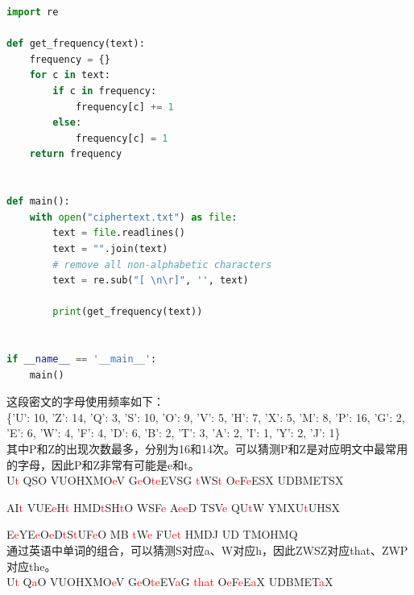 
\begin{lstlisting}[language=Python]
import re

def get_frequency(text):
    frequency = {}
    for c in text:
        if c in frequency:
            frequency[c] += 1
        else:
            frequency[c] = 1
    return frequency


def main():
    with open("ciphertext.txt") as file:
        text = file.readlines()
        text = "".join(text)   
        # remove all non-alphabetic characters
        text = re.sub("[ \n\r]", '', text)

        print(get_frequency(text))


if __name__ == '__main__':
    main()
\end{lstlisting}

这段密文的字母使用频率如下：\\

\{'U': 10, 'Z': 14, 'Q': 3, 'S': 10, 'O': 9, 'V': 5, 'H': 7, 'X': 5, 'M': 8, 'P': 16, 'G': 2, 'E': 6, 'W': 4, 'F': 4, 'D': 6, 'B': 2, 'T': 3, 'A': 2, 'I': 1, 'Y': 2, 'J': 1\}\\

其中P和Z的出现次数最多，分别为16和14次。可以猜测P和Z是对应明文中最常用的字母，因此P和Z非常有可能是e和t。\\

U\textcolor{red}{t} QSO VUOHXMO\textcolor{red}{e}V G\textcolor{red}{e}O\textcolor{red}{t}\textcolor{red}{e}EVSG \textcolor{red}{t}WS\textcolor{red}{t} O\textcolor{red}{e}F\textcolor{red}{e}ESX UDBMETSX

AI\textcolor{red}{t} VUE\textcolor{red}{e}H\textcolor{red}{t} HMD\textcolor{red}{t}SH\textcolor{red}{t}O WSF\textcolor{red}{e} A\textcolor{red}{ee}D TSV\textcolor{red}{e} QU\textcolor{red}{t}W YMXU\textcolor{red}{t}UHSX

E\textcolor{red}{e}YE\textcolor{red}{e}O\textcolor{red}{e}D\textcolor{red}{t}S\textcolor{red}{t}UF\textcolor{red}{e}O MB \textcolor{red}{t}W\textcolor{red}{e} FU\textcolor{red}{et} HMDJ UD TMOHMQ\\

通过英语中单词的组合，可以猜测S对应a、W对应h，因此ZWSZ对应that、ZWP对应the。\\

U\textcolor{red}{t} Q\textcolor{red}{a}O VUOHXMO\textcolor{red}{e}V G\textcolor{red}{e}O\textcolor{red}{t}\textcolor{red}{e}EV\textcolor{red}{a}G \textcolor{red}{that} O\textcolor{red}{e}F\textcolor{red}{e}E\textcolor{red}{a}X UDBMET\textcolor{red}{a}X

